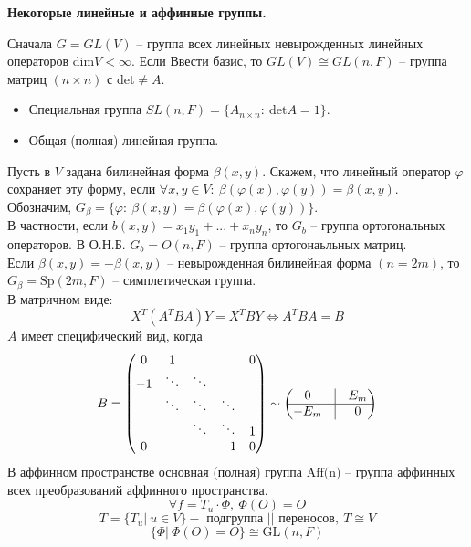 \documentclass[a4paper, 12pt]{article}
\theoremstyle{definition}
\begin{document}
        \begin{center}
            \textbf{Некоторые линейные и аффинные группы.} 
        \end{center}
        Сначала $G = GL(V)$ -- группа всех линейных невырожденных линейных операторов dim$V < \infty$. Если Ввести базис, то $GL(V) \cong GL(n,F)$ -- группа матриц $(n\times n)$ с det$\neq A$.
        \begin{itemize}
            \item Специальная группа $SL(n,F) = \{A_{n\times n}:\ \text{det}A = 1\}$.
            \item Общая (полная) линейная группа. 
        \end{itemize}
        Пусть в $V$ задана билинейная форма $\beta(x,y)$. Скажем, что линейный оператор $\varphi$ сохраняет эту форму, если $\forall x,y \in V:\ \beta(\varphi(x), \varphi(y)) = \beta(x,y)$.\\
        Обозначим, $G_\beta = \{\varphi:\ \beta(x,y) = \beta(\varphi(x), \varphi(y))\}$.\\
        В частности, если $b(x,y) = x_1y_1 + ... + x_ny_n$, то $G_b$ -- группа ортогональных операторов. В О.Н.Б. $G_b = O(n,F)$ -- группа ортогонаьльных матриц.\\
        Если $\beta(x,y) = - \beta(x,y)$ -- невырожденная билинейная форма $(n = 2m)$, то 
        $G_\beta = \text{Sp}(2m,F)$ -- симплетическая группа.\\
        В матричном виде:
        $$X^T(A^TBA)Y = X^TBY \Longleftrightarrow A^TBA = B$$
        $A$ имеет специфический вид, когда 
        $$B = \begin{pmatrix}
            0 & 1 & \null & \null & 0\\
                -1 & \ddots & \ddots & \null & \null\\
                \null & \ddots & \ddots & \ddots & \null\\
                \null & \null & \ddots & \ddots & 1\\
                0 & \null & \null & -1 & 0
        \end{pmatrix} \sim \begin{pmatrix}
            0 & \vline & E_m\\
            \hline
            - E_m & \vline & 0
        \end{pmatrix}$$
        В аффинном пространстве основная (полная) группа $\text{Aff(n)}$ -- группа аффинных всех преобразований аффинного пространства.
        $$\forall f = T_u\cdot \Phi,\ \Phi(O) = O$$
        $$T = \{T_u|\ u \in V\} - \text{ подгруппа || переносов},\ T \cong V$$
        $$\{\Phi|\ \Phi(O) = O\} \cong \text{GL}(n,F)$$


















    
\end{document}
